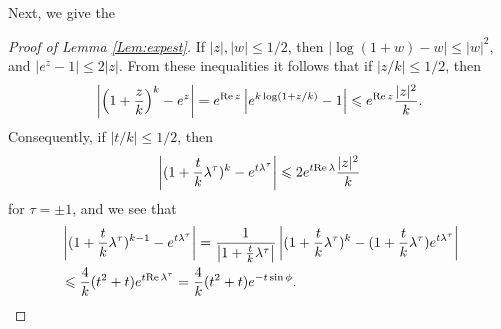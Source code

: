 \documentclass{article}
\numberwithin{equation}{section}
\numberwithin{figure}{section}
\theoremstyle{plain}
\theoremstyle{plain}
\numberwithin{thm}{section}
\theoremstyle{remark}
\newcommand{\re}{\text{{\rm Re}\,}}
\let \le \leqslant
\begin{document}
Next, we give the
\begin{proof}[Proof of Lemma \ref{Lem:expest}]
If $|z|,|w|\le 1/2$, then $|\log(1+w)-w|\le |w|^2$, and $|e^z-1|\le 2|z|$. From these inequalities it follows that if $|z/k|\le 1/2$, then
\begin{equation*}
\left|\left(1+\frac zk\right)^k-e^z\right|=e^{\re z}\left|e^{k\log(1+z/k)}-1\right|\le e^{\re z}\frac{|z|^2}k.
\end{equation*}
Consequently, if $|t/k|\le 1/2$, then
\begin{equation*}
\left|(1+\frac tk\lambda^\tau)^k-e^{t\lambda^\tau}\right|\le 2e^{t\re\lambda}\frac{|z|^2}k
\end{equation*}
for $\tau=\pm 1$, and we see that
\begin{align*}
&\left|(1+\frac tk\lambda^\tau)^{k-1}-e^{t\lambda^\tau}\right|=\frac 1{\left|1+\frac tk\lambda^\tau\right|}\left|(1+\frac tk\lambda^\tau)^k-(1+\frac tk\lambda^\tau)e^{t\lambda^\tau}\right|\\
&\le\frac 4k(t^2+t)e^{t\re\lambda^\tau}=\frac 4k(t^2+t)e^{-t\sin\phi}.
\end{align*}
\end{proof}
\end{document}
